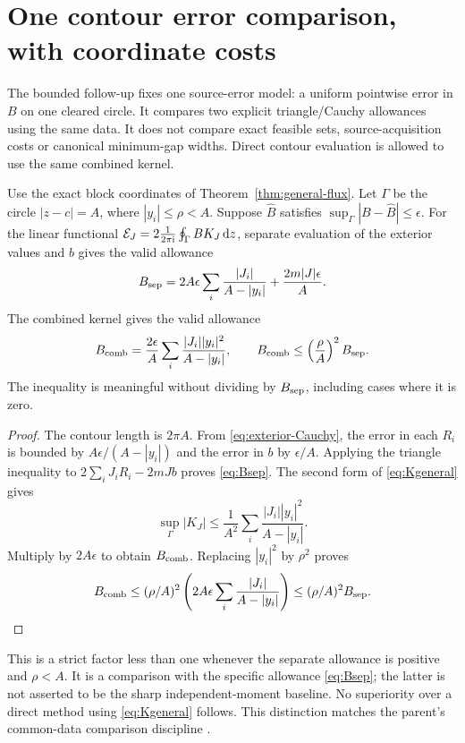 \section{One contour error comparison, with coordinate costs}
\label{sec:errors}

The bounded follow-up fixes one source-error model: a uniform
pointwise error in $B$ on one cleared circle. It compares two
explicit triangle/Cauchy allowances using the same data. It does
not compare exact feasible sets, source-acquisition costs or
canonical minimum-gap widths. Direct contour evaluation is
allowed to use the same combined kernel.

\begin{theorem}
\label{thm:quadratic}
Use the exact block coordinates of Theorem~\ref{thm:general-flux}.
Let $\Gamma$ be the circle $|z-c|=A$, where
$|y_i|\le\rho<A$. Suppose $\widehat B$ satisfies
$\sup_\Gamma|B-\widehat B|\le\epsilon$. For the linear functional
$\mathcal E_J=2\frac{1}{2\pi\mathrm i}\oint_\Gamma BK_J\,\mathrm d z$, separate evaluation of the exterior values
and $b$ gives the valid allowance
\begin{equation}
 B_{\rm sep}=2A\epsilon\sum_i\frac{|J_i|}{A-|y_i|}
                      +\frac{2m|J|\epsilon}{A}.
 \label{eq:Bsep}
\end{equation}
The combined kernel gives the valid allowance
\begin{equation}
 B_{\rm comb}=\frac{2\epsilon}{A}
                  \sum_i\frac{|J_i||y_i|^2}{A-|y_i|},
 \qquad
 B_{\rm comb}\le\left(\frac\rho A\right)^2 B_{\rm sep}.
 \label{eq:Bcomb}
\end{equation}
The inequality is meaningful without dividing by $B_{\rm sep}$,
including cases where it is zero.
\end{theorem}
\begin{proof}
The contour length is $2\pi A$. From
\eqref{eq:exterior-Cauchy}, the error in each $R_i$ is bounded by
$A\epsilon/(A-|y_i|)$ and the error in $b$ by $\epsilon/A$.
Applying the triangle inequality to
$2\sum_iJ_iR_i-2mJb$ proves \eqref{eq:Bsep}.
The second form of \eqref{eq:Kgeneral} gives
\[
 \sup_\Gamma|K_J|\le\frac1{A^2}
                   \sum_i\frac{|J_i||y_i|^2}{A-|y_i|}.
\]
Multiply by $2A\epsilon$ to obtain $B_{\rm comb}$. Replacing
$|y_i|^2$ by $\rho^2$ proves
\[
 B_{\rm comb}\le(\rho/A)^2
       \left(2A\epsilon\sum_i\frac{|J_i|}{A-|y_i|}\right)
       \le(\rho/A)^2 B_{\rm sep}.
\]
\end{proof}

This is a strict factor less than one whenever the separate
allowance is positive and $\rho<A$. It is a comparison with the
specific allowance \eqref{eq:Bsep}; the latter is not asserted
to be the sharp independent-moment baseline. No superiority over
a direct method using \eqref{eq:Kgeneral} follows. This distinction
matches the parent's common-data comparison discipline
\cite{BakerCorrelation2026}.

